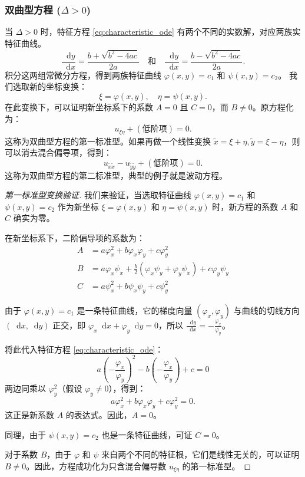 \documentclass[a4paper, 12pt, oneside]{article} %
\newcommand{\diff}{\mathop{}\!\mathrm{d}}
\numberwithin{subsection}{section}
\numberwithin{subsubsection}{subsection}
\theoremstyle{plain}
\theoremstyle{definition}
\theoremstyle{remark}
\begin{document}
		\subsubsection{双曲型方程 (\texorpdfstring{$\Delta > 0$}{Delta > 0})}
		当 \(\Delta > 0\) 时，特征方程 \eqref{eq:characteristic_ode} 有两个不同的实数解，对应两族实特征曲线。
		\[
		\frac{\diff y}{\diff x} = \frac{b + \sqrt{b^2-4ac}}{2a} \quad \text{和} \quad \frac{\diff y}{\diff x} = \frac{b - \sqrt{b^2-4ac}}{2a}.
		\]
		积分这两组常微分方程，得到两族特征曲线 \(\varphi(x,y) = c_1\) 和 \(\psi(x,y) = c_2\)。
		我们选取新的坐标变换：
		\[
		\xi = \varphi(x,y), \quad \eta = \psi(x,y).
		\]
		在此变换下，可以证明新坐标系下的系数 \(A=0\) 且 \(C=0\)，而 \(B \neq 0\)。原方程化为：
		\begin{equation}\label{eq:hyperbolic_canonical_1}
			u_{\xi\eta} + (\text{低阶项}) = 0.
		\end{equation}
		这称为双曲型方程的第一标准型。如果再做一个线性变换 \(\tilde{x} = \xi+\eta, \tilde{y}=\xi-\eta\)，则可以消去混合偏导项，得到：
		\begin{equation}\label{eq:hyperbolic_canonical_2}
			u_{\tilde{x}\tilde{x}} - u_{\tilde{y}\tilde{y}} + (\text{低阶项}) = 0.
		\end{equation}
		这称为双曲型方程的第二标准型，典型的例子就是波动方程。
		
		\begin{proof}[第一标准型变换验证]
			我们来验证，当选取特征曲线 \(\varphi(x,y)=c_1\) 和 \(\psi(x,y)=c_2\) 作为新坐标 \(\xi=\varphi(x,y)\) 和 \(\eta=\psi(x,y)\) 时，新方程的系数 \(A\) 和 \(C\) 确实为零。
			
			在新坐标系下，二阶偏导项的系数为：
			\begin{align*}
				A &= a\varphi_x^2 + b\varphi_x\varphi_y + c\varphi_y^2 \\
				B &= a\varphi_x\psi_x + \frac{b}{2}(\varphi_x\psi_y + \varphi_y\psi_x) + c\varphi_y\psi_y \\
				C &= a\psi_x^2 + b\psi_x\psi_y + c\psi_y^2
			\end{align*}
			
			由于 \(\varphi(x,y)=c_1\) 是一条特征曲线，它的梯度向量 \((\varphi_x, \varphi_y)\) 与曲线的切线方向 \((\diff x, \diff y)\) 正交，即 \(\varphi_x \diff x + \varphi_y \diff y = 0\)，所以 \(\frac{\diff y}{\diff x} = -\frac{\varphi_x}{\varphi_y}\)。
			
			将此代入特征方程 \eqref{eq:characteristic_ode}：
			\[
			a \left(-\frac{\varphi_x}{\varphi_y}\right)^2 - b \left(-\frac{\varphi_x}{\varphi_y}\right) + c = 0
			\]
			两边同乘以 \(\varphi_y^2\)（假设 \(\varphi_y \neq 0\)），得到：
			\[
			a\varphi_x^2 + b\varphi_x\varphi_y + c\varphi_y^2 = 0.
			\]
			这正是新系数 \(A\) 的表达式。因此，\(A=0\)。
			
			同理，由于 \(\psi(x,y)=c_2\) 也是一条特征曲线，可证 \(C=0\)。
			
			对于系数 \(B\)，由于 \(\varphi\) 和 \(\psi\) 来自两个不同的特征根，它们是线性无关的，可以证明 \(B \neq 0\)。因此，方程成功化为只含混合偏导数 \(u_{\xi\eta}\) 的第一标准型。
		\end{proof}
		
\end{document}
